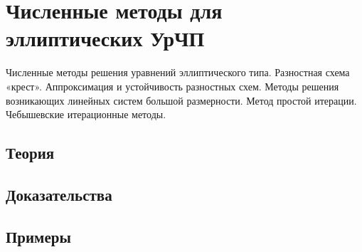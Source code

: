 
\section{Численные методы для эллиптических УрЧП}
\label{sec:2.1.15-fd-elliptic}

\begin{ticket}
Численные методы решения уравнений эллиптического типа. Разностная схема «крест». Аппроксимация и устойчивость разностных схем. Методы решения возникающих линейных систем большой размерности. Метод простой итерации. Чебышевские итерационные методы.
\end{ticket}

\subsection*{Теория}

\subsection*{Доказательства}

\subsection*{Примеры}
